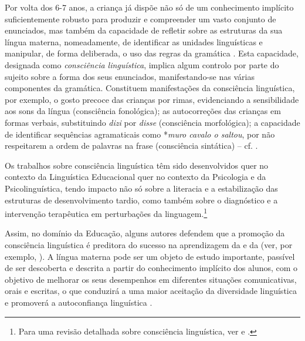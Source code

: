 \documentclass[output=paper]{LSP/langsci}
\begin{document}
Por volta dos 6-7 anos, a criança já dispõe não só de um conhecimento implícito suficientemente robusto para produzir e compreender um vasto conjunto de enunciados, mas também da capacidade de refletir sobre as estruturas da sua língua materna, nomeadamente, de identificar as unidades linguísticas e manipular, de forma deliberada, o uso das regras da gramática \citep{gombert1992,duarte2008}. Esta capacidade, designada como \textit{consciência linguística}, implica algum controlo por parte do sujeito sobre a forma dos seus enunciados, manifestando-se nas várias componentes da gramática. Constituem manifestações da consciência linguística, por exemplo, o gosto precoce das crianças por rimas, evidenciando a sensibilidade aos sons da língua (consciência fonológica); as autocorreções das crianças em formas verbais, substituindo \textit{dizi} por \textit{disse} (consciência morfológica); a capacidade de identificar sequências agramaticais como *\textit{muro cavalo o saltou}, por não respeitarem a ordem de palavras na frase (consciência sintática) – cf. \citet{goncalves_etal2011}. 

Os trabalhos sobre consciência linguística têm sido desenvolvidos quer no contexto da Linguística Educacional quer no contexto da Psicologia e da Psicolinguística, tendo impacto não só sobre a literacia e a estabilização das estruturas de desenvolvimento tardio, como também sobre o diagnóstico e a intervenção terapêutica em perturbações da linguagem.\footnote{Para uma revisão detalhada sobre consciência linguística, ver \citet{barbeiro1999} e \citet{castelo2012}.}

\largerpage Assim, no domínio da Educação, alguns autores defendem que a promoção da consciência linguística é preditora do sucesso na aprendizagem da  e da  (ver, por exemplo, \citealt{hudson2001}). A língua materna pode ser um objeto de estudo importante, passível de ser descoberta e descrita a partir do conhecimento implícito dos alunos, com o objetivo de melhorar os seus desempenhos em diferentes situações comunicativas, orais e escritas, o que conduzirá a uma maior aceitação da diversidade linguística e promoverá a autoconfiança linguística \citep{duarte1998,duarte2008}. 
\end{document}
